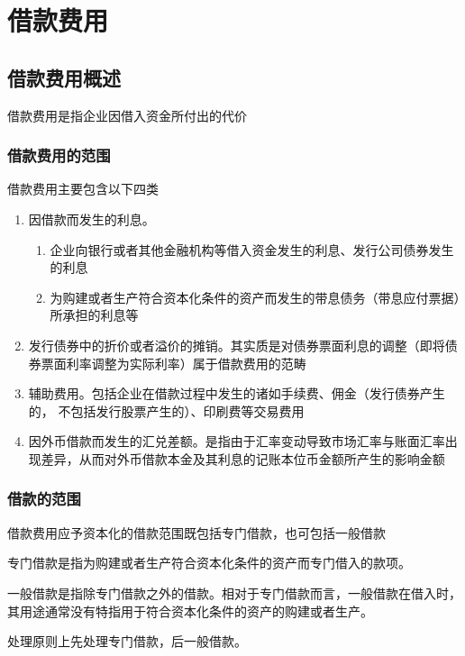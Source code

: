 \documentclass[UTF8,12pt]{ctexart}
\numberwithin{equation}{section} %
\numberwithin{figure}{section}
\numberwithin{table}{section}
\begin{document}
	\newpage
	\section{借款费用}
	
	\subsection{借款费用概述}
	借款费用是指企业因借入资金所付出的代价
	\subsubsection{借款费用的范围}
	借款费用主要包含以下四类
	\begin{enumerate}
		\item 因借款而发生的利息。
		\begin{enumerate}
			\item 企业向银行或者其他金融机构等借入资金发生的利息、发行公司债券发生的利息
			
			\item 为购建或者生产符合资本化条件的资产而发生的带息债务（带息应付票据）所承担的利息等
		\end{enumerate}
		
		\item 发行债券中的折价或者溢价的摊销。其实质是对债券票面利息的调整（即将债券票面利率调整为实际利率）属于借款费用的范畴
		
		\item 辅助费用。包括企业在借款过程中发生的诸如手续费、佣金（发行债券产生的， 不包括发行股票产生的）、印刷费等交易费用
		
		\item 因外币借款而发生的汇兑差额。是指由于汇率变动导致市场汇率与账面汇率出现差异，从而对外币借款本金及其利息的记账本位币金额所产生的影响金额
	\end{enumerate}
	
	\subsubsection{借款的范围}
	借款费用应予资本化的借款范围既包括专门借款，也可包括一般借款
	
	专门借款是指为购建或者生产符合资本化条件的资产而专门借入的款项。
	
	一般借款是指除专门借款之外的借款。相对于专门借款而言，一般借款在借入时， 其用途通常没有特指用于符合资本化条件的资产的购建或者生产。
	
	处理原则上先处理专门借款，后一般借款。
	
\end{document}
